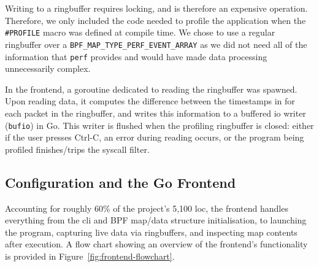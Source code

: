 Writing to a ringbuffer requires locking, and is therefore an expensive
operation. Therefore, we only included the code needed to profile the
application when the \texttt{\#PROFILE} macro was defined at compile time.
We chose to use a regular ringbuffer over a 
\texttt{BPF\_MAP\_TYPE\_PERF\_EVENT\_ARRAY} as we did not need all of the
information that \texttt{perf} provides and would have made data processing
unnecessarily complex.

In the frontend, a goroutine dedicated to reading the ringbuffer was spawned.
Upon reading data, it computes the difference between the timestamps in for each 
packet in the ringbuffer, and writes this information to a buffered \ac{io} 
writer (\texttt{bufio}) in Go. This writer is flushed when the profiling 
ringbuffer is closed: either if the user presses Ctrl-C, an error during 
reading occurs, or the program being profiled finishes/trips the syscall 
filter.

\subsection{Configuration and the Go Frontend}\label{subsec:impl-frontend}

Accounting for roughly 60\% of the project's 5,100 \ac{loc}, the frontend handles 
everything from the \ac{cli} and BPF  map/data structure initialisation, to 
launching the program, capturing live data via ringbuffers, and inspecting 
map contents after execution. A flow chart showing an overview of the frontend's
functionality is provided in Figure~\ref{fig:frontend-flowchart}.

